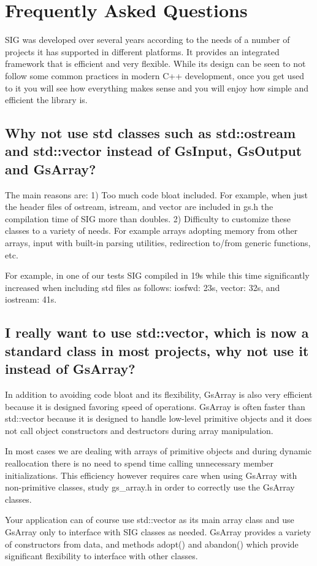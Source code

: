 \section{Frequently Asked Questions}

SIG was developed over several years according to the needs of a number of projects it has supported in different platforms. It provides an integrated framework that is efficient and very flexible. While its design can be seen to not follow some common practices in modern C++ development, once you get used to it you will see how everything makes sense and you will enjoy how simple and efficient the library is.

\subsection{Why not use std classes such as std::ostream and std::vector instead of GsInput, GsOutput and GsArray?}

The main reasons are:
1) Too much code bloat included. For example, when just the header files of ostream, istream, and vector 
are included in gs.h the compilation time of SIG more than doubles.
2) Difficulty to customize these classes to a variety of needs. For example arrays adopting memory from other arrays, input with built-in parsing utilities, redirection to/from generic functions, etc.

For example, in one of our tests SIG compiled in 19s while this time significantly increased when including std files as follows: 
iosfwd: 23s,
vector: 32s, and
iostream: 41s.

\subsection{I really want to use std::vector, which is now a standard class in most projects, why not use it instead of GsArray?}

In addition to avoiding code bloat and its flexibility, GsArray is also very efficient because it is designed favoring speed of operations. 
GsArray is often faster than std::vector because it is designed to handle low-level primitive objects and it does not call object constructors and destructors during array manipulation.

In most cases we are dealing with arrays of primitive objects and during dynamic reallocation there is no need to spend time calling unnecessary member initializations. This efficiency however requires care when using GsArray with non-primitive classes, study gs\_array.h in order to correctly use the GsArray classes.

Your application can of course use std::vector as its main array class and use GsArray only to interface with SIG classes as needed. GsArray provides a variety of constructors from data, and methods adopt() and abandon() which provide significant flexibility to interface with other classes.



